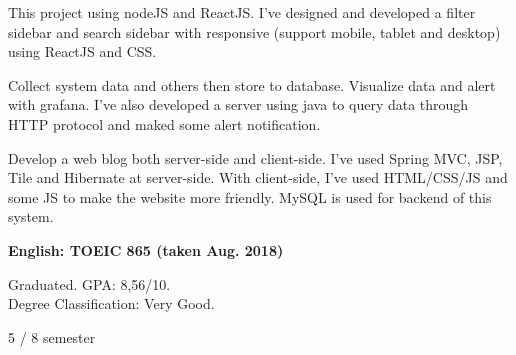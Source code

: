 \documentclass[10pt,a4paper,ragged2e]{altacv}
\begin{document}
\begin{paracol}{2}
\divider\smallskip

This project using nodeJS and ReactJS. I've designed and developed a filter sidebar and search sidebar with responsive (support mobile, tablet and desktop) using ReactJS and CSS.

\divider\smallskip

Collect system data and others then store to database. Visualize data and alert with grafana. I've also developed a server using java to query data through HTTP protocol and maked some alert notification.

\divider\smallskip

Develop a web blog both server-side and client-side. I've used Spring MVC, JSP, Tile and Hibernate at server-side. With client-side, I've used HTML/CSS/JS and some JS to make the website more friendly. MySQL is used for backend of this system.



\textbf{English: TOEIC 865 (taken Aug. 2018)}


\medskip
\newpage
{}


Graduated. GPA: 8,56/10. \\ Degree Classification: Very Good.


\medskip
{}


\divider


5 / 8 semester
\end{paracol}
\end{document}
